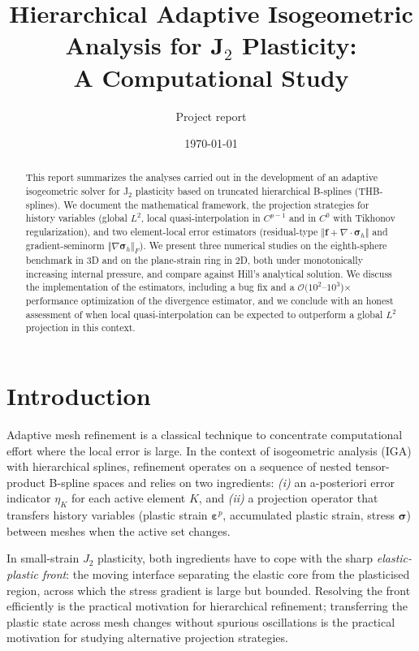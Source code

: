 \documentclass[11pt,a4paper]{article}
\title{\bfseries Hierarchical Adaptive Isogeometric Analysis for J\texorpdfstring{$_2$}{2} Plasticity:\\[0.3em] A Computational Study}
\author{Project report}
\date{\today}
\newcommand{\bsigma}{\boldsymbol{\sigma}}
\newcommand{\beps}{\boldsymbol{\varepsilon}}
\newcommand{\bff}{\mathbf{f}}
\newcommand{\divg}{\nabla \cdot}
\begin{document}
\maketitle

\begin{abstract}
\noindent
This report summarizes the analyses carried out in the development of an
adaptive isogeometric solver for J$_2$ plasticity based on truncated
hierarchical B-splines (THB-splines).  We document the mathematical
framework, the projection strategies for history variables (global $L^2$,
local quasi-interpolation in $C^{p-1}$ and in $C^0$ with Tikhonov
regularization), and two element-local error estimators (residual-type
$\Vert \bff + \divg\bsigma_h\Vert$ and gradient-seminorm $\Vert\nabla
\bsigma_h\Vert_F$).  We present three numerical studies on the
eighth-sphere benchmark in 3D and on the plane-strain ring in 2D, both
under monotonically increasing internal pressure, and compare against
Hill's analytical solution.  We discuss the implementation of the
estimators, including a bug fix and a $\mathcal{O}(10^2$--$10^3$)$\times$
performance optimization of the divergence estimator, and we conclude with
an honest assessment of when local quasi-interpolation can be expected to
outperform a global $L^2$ projection in this context.
\end{abstract}

\tableofcontents

\section{Introduction}

Adaptive mesh refinement is a classical technique to concentrate
computational effort where the local error is large.  In the context of
isogeometric analysis (IGA) with hierarchical splines, refinement
operates on a sequence of nested tensor-product B-spline spaces and
relies on two ingredients: \emph{(i)} an a-posteriori error indicator
$\eta_K$ for each active element $K$, and \emph{(ii)} a projection
operator that transfers history variables (plastic strain
$\beps^p$, accumulated plastic strain, stress $\bsigma$) between meshes
when the active set changes.

In small-strain $J_2$ plasticity, both ingredients have to cope with the
sharp \emph{elastic-plastic front}: the moving interface separating the
elastic core from the plasticised region, across which the stress
gradient is large but bounded.  Resolving the front efficiently is the
practical motivation for hierarchical refinement; transferring the
plastic state across mesh changes without spurious oscillations is the
practical motivation for studying alternative projection strategies.
\end{document}
